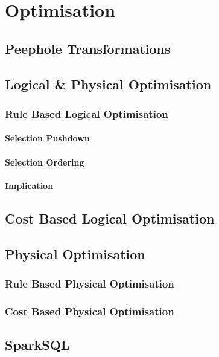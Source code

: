 \chapter{Optimisation}

\section{Peephole Transformations}


\section{Logical \& Physical Optimisation}

\subsection{Rule Based Logical Optimisation}

\subsubsection{Selection Pushdown}

\subsubsection{Selection Ordering}

\subsubsection{Implication}

\section{Cost Based Logical Optimisation}


\section{Physical Optimisation}

\subsection{Rule Based Physical Optimisation}


\subsection{Cost Based Physical Optimisation}


\section{SparkSQL}
\unfinished
